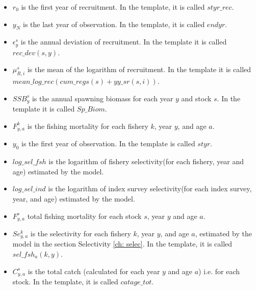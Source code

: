 \documentclass{article}
\begin{document}
\begin{itemize}
    \item $r_0$ is the first year of recruitment. In the template, it is called  $styr\_rec$.
    \item $y_N$ is the last year of observation. In the template, it is called $endyr$.
    \item $\epsilon^s_y$ is the annual deviation of recruitment. In the template it is called $rec\_dev(s,y)$.
    \item $\mu^s_{R,i}$ is the mean of the logarithm of recruitment. In the template it is called $mean\_log\_rec(cum\_regs(s)+yy\_sr(s,i))$.
    \item $SSB^s_{y}$ is the annual spawning biomass for each year $y$ and stock $s$. In the template it is called $Sp\_Biom$.
    \item $F^{k}_{y,a}$ is the fishing mortality for each fishery $k$, year $y$, and age $a$.
    \item $y_0$ is the first year of observation. In the template is called $styr$.
    \item $log\_sel\_fsh$ is the logarithm of fishery selectivity(for each fishery, year and age) estimated by the model. 
    \item $log\_sel\_ind$ is the logarithm of index survey selectivity(for each index survey, year, and age) estimated by the model. 
    \item $F^s_{y,a}$ total fishing mortality for each stock $s$, year $y$ and age $a$.
    \item $Se^k_{y,a}$ is the selectivity for each fishery $k$, year $y$, and age $a$, estimated by the model in the section Selectivity \ref{ch: selec}. In the template, it is called $sel\_fsh_a(k,y)$.
    
    \item $C^s_{y,a}$ is the total catch (calculated for each year $y$  and age $a$) i.e. for each stock. In the template, it is called $catage\_tot$.


\end{itemize}
\end{document}
